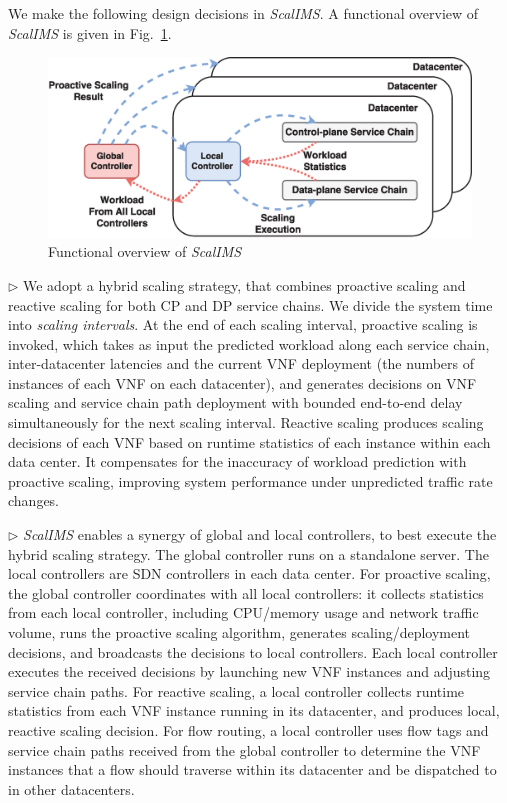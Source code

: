 We make the following design decisions in \textit{ScalIMS}. A functional overview of \textit{ScalIMS} is given in Fig.~\ref{fig:system-overview}.

\begin{figure}[!h]
      \includegraphics[width=\columnwidth]{chap-scalims/figure/scalims-overall-arch.eps}
    \caption{Functional overview of \textit{ScalIMS}}%
    \label{fig:system-overview}
\end{figure}

$\triangleright$ We adopt a hybrid scaling strategy, that combines proactive scaling and reactive scaling for both CP and DP service chains. We divide the system time into \textit{scaling intervals}. At the end of each scaling interval, proactive scaling is invoked, which takes as input the predicted workload along each service chain, inter-datacenter latencies and the current VNF deployment (the numbers of instances of each VNF on each datacenter), and generates decisions on VNF scaling and service chain path deployment with bounded end-to-end delay simultaneously for the next scaling interval. Reactive scaling produces scaling decisions of each VNF based on runtime statistics of each instance within each data center. It compensates for the inaccuracy of workload prediction with proactive scaling, improving system performance under unpredicted traffic rate changes.


$\triangleright$ \textit{ScalIMS} enables a synergy of global and local controllers, to best execute the hybrid scaling strategy. The global controller runs on a standalone server. The local controllers are SDN controllers in each data center. For proactive scaling, the global controller coordinates with all local controllers: it collects statistics from each local controller, including CPU/memory usage and network traffic volume, runs the proactive scaling algorithm, generates scaling/deployment decisions, and broadcasts the decisions to local controllers. Each local controller executes the received decisions by launching new VNF instances and adjusting service chain paths. For reactive scaling, a local controller collects runtime statistics from each VNF instance running in its datacenter, and produces local, reactive scaling decision. For flow routing, a local controller uses flow tags and service chain paths received from the global controller to determine the VNF instances that a flow should traverse within its datacenter and be dispatched to in other datacenters.


